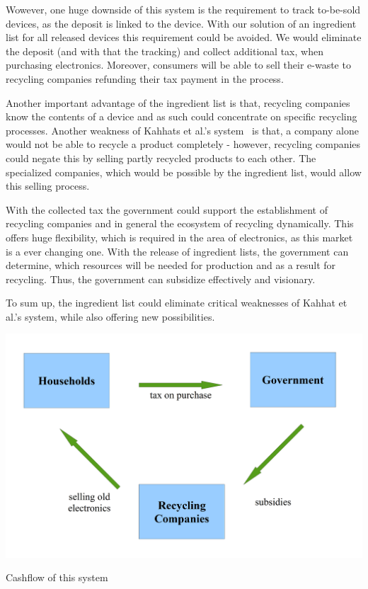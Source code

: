 Wowever, one huge downside of this system is the requirement to track to-be-sold devices, 
as the deposit is linked to the device. With our solution of an ingredient list for 
all released devices  this requirement could be avoided. We would eliminate the deposit 
(and with that the tracking) and collect additional tax, when purchasing electronics. 
Moreover, consumers will be able to sell their e-waste to recycling companies refunding their tax payment in the process. 

Another important advantage of the ingredient list is that, recycling companies know the 
contents of a device and as such could concentrate on specific recycling processes. 
Another weakness of Kahhats et al.'s system~\cite{kahhat2008exploring} is that, a company alone would not 
be able to recycle a product completely - however, recycling companies could negate this 
by selling partly recycled products to each other. The specialized companies, which would 
be possible by the ingredient list, would allow this selling process.

With the collected tax the government could support the establishment of recycling companies 
and in general the ecosystem of recycling dynamically. This offers huge flexibility, which 
is required in the area of electronics, as this market is a ever changing one. With the 
release of ingredient lists, the government can determine, which resources will be needed 
for production and  as a result for recycling. Thus, the government can subsidize effectively and visionary.

To sum up, the ingredient list could eliminate critical weaknesses of Kahhat et al.'s system, 
while also offering new possibilities.

\begin{center}
\begin{table}[!htbp]
\includegraphics[width=0.5\columnwidth]{figure/cashflow.png}
\label{table:2}
\caption{Cashflow of this system}
\end{table}
\end{center}


\label{applications}